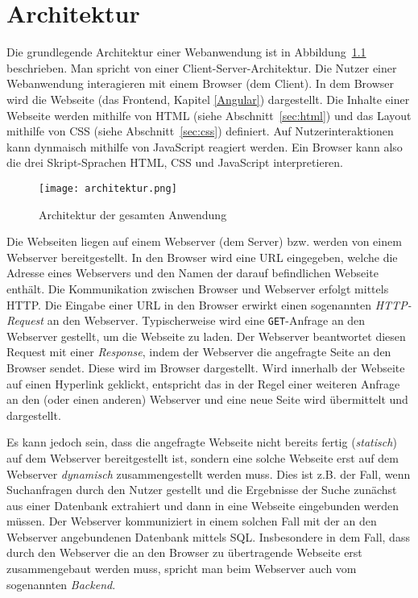 \chapter{Architektur}

Die grundlegende Architektur einer Webanwendung ist in Abbildung~\ref{img:architektur} beschrieben. Man spricht von einer Client-Server-Architektur. Die Nutzer einer Webanwendung interagieren mit einem Browser (dem Client). In dem Browser wird die Webseite (das Frontend, Kapitel \ref{Angular}) dargestellt. Die Inhalte einer Webseite werden mithilfe von \ac{HTML} (siehe Abschnitt~\ref{sec:html}) und das Layout mithilfe von \ac{CSS} (siehe Abschnitt~\ref{sec:css}) definiert. Auf Nutzerinteraktionen kann dynmaisch mithilfe von JavaScript reagiert werden. Ein Browser kann also die drei Skript-Sprachen HTML, CSS und JavaScript interpretieren.

\begin{figure}[htbp]
    \centering
    \texttt{[image: architektur.png]}
    \caption{Architektur der gesamten Anwendung}
    \label{img:architektur}
\end{figure}

Die Webseiten liegen auf einem Webserver (dem Server) bzw. werden von einem Webserver bereitgestellt. In den Browser wird eine \ac{URL} eingegeben, welche die Adresse eines Webservers und den Namen der darauf befindlichen Webseite enthält. Die Kommunikation zwischen Browser und Webserver erfolgt mittels \ac{HTTP}. Die Eingabe einer URL in den Browser erwirkt einen sogenannten \textit{HTTP-Request} an den Webserver. Typischerweise wird eine \texttt{GET}-Anfrage an den Webserver gestellt, um die Webseite zu laden. Der Webserver beantwortet diesen Request mit einer \textit{Response}, indem der Webserver die angefragte Seite an den Browser sendet. Diese wird im Browser dargestellt. Wird innerhalb der Webseite auf einen Hyperlink geklickt, entspricht das in der Regel einer weiteren Anfrage an den (oder einen anderen) Webserver und eine neue Seite wird übermittelt und dargestellt.

Es kann jedoch sein, dass die angefragte Webseite nicht bereits fertig (\textit{statisch}) auf dem Webserver bereitgestellt ist, sondern eine solche Webseite erst auf dem Webserver \textit{dynamisch} zusammengestellt werden muss. Dies ist z.B. der Fall, wenn Suchanfragen durch den Nutzer gestellt und die Ergebnisse der Suche zunächst aus einer Datenbank extrahiert und dann in eine Webseite eingebunden werden müssen. Der Webserver kommuniziert in einem solchen Fall mit der an den Webserver angebundenen Datenbank mittels \ac{SQL}. Insbesondere in dem Fall, dass durch den Webserver die an den Browser zu übertragende Webseite erst \glqq zusammengebaut\grqq{} werden muss, spricht man beim Webserver auch vom sogenannten \textit{Backend}.

